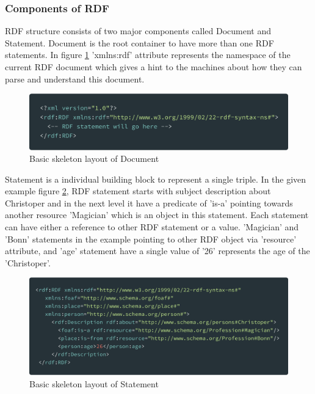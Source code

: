 	\subsubsection{Components of RDF}
	
		RDF structure consists of two major components called Document and Statement. Document is the root container to have more than one RDF statements. In figure \ref{fig:rdf_document} 'xmlns:rdf' attribute represents the namespace of the current RDF document which gives a hint to the machines about how they can parse and understand this document.
		\begin{figure}[!htbp] 
			\begin{center}
				\includegraphics[scale=0.1]{./images/png/rdf/document}	
				\caption{Basic skeleton layout of Document}	
				\label{fig:rdf_document}	
			\end{center}
		\end{figure}
		
		Statement is a individual building block to represent a single triple. In the given example figure \ref{fig:rdf_statement}, RDF statement starts with subject description about Christoper and in the next level it have a predicate of 'is-a' pointing towards another resource 'Magician' which is an object in this statement. Each statement can have either a reference to other RDF statement or a value. 'Magician' and 'Bonn' statements in the example pointing to other RDF object via 'resource' attribute, and 'age' statement have a single value of '26' represents the age of the 'Christoper'.
		
		\begin{figure}[!htbp] 
			\begin{center}
				\includegraphics[scale=0.1]{./images/png/rdf/statement}	
				\caption{Basic skeleton layout of Statement}	
				\label{fig:rdf_statement}	
			\end{center}
		\end{figure}
	
